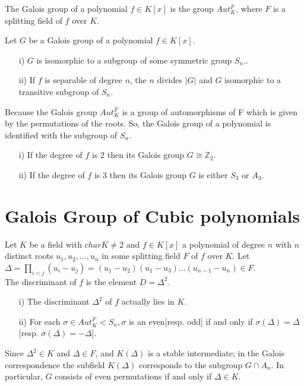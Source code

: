 \begin{definition}
  The Galois group of a polynomial \(f \in K[x]\) is the group \(Aut_K^F\), where \(F\) is a splitting field of \(f\) over \(K\).
  \end{definition}

  \begin{theorem}
  Let \(G\) be a Galois group of a polynomial \(f \in K[x]\).
\begin{enumerate}
\item[i)] \(G\) is isomorphic to a subgroup of some symmetric group \(S_n\)..
  \item[ii)] If \(f\) is separable of degree \(n\), the \(n\) divides \(|G|\) and \(G\) isomorphic to a transitive subgroup of \(S_n\).
  \end{enumerate}
\end{theorem}
Because the Galois group \(Aut_K^F\) is a group of automorphisms of F which is given by the permutations of the roots.
So, the Galois group of a polynomial is identified with the subgroup of \(S_n\).\\

\begin{corollary}
\begin{enumerate}
\item[i)] If the degree of \(f\) is \(2\) then its Galois group \(G \cong {\mathbb{Z}}_2\).
  \item[ii)] If the degree of \(f\) is \(3\) then its Galois group \(G\) is either \(S_3\) or \(A_3\).
  \end{enumerate}
\end{corollary}


\section{Galois Group of Cubic polynomials}
\begin{definition}
  Let \(K\) be a field with \(char K \neq 2\) and \(f \in K[x]\) a polynomial of degree \(n\) with \(n\) distinct roots \(u_1,u_2,...,u_n\) in some splitting field \(F\) of \(f\) over \(K\). Let \(\Delta = \prod\limits_{i<j}(u_i-u_j) = (u_1-u_2)(u_1-u_3)...(u_{n-1}-u_n) \in F\).\\
  The discriminant of \(f\) is the element \(D= {\Delta}^2\).
\end{definition}

\begin{theorem}
\begin{enumerate}
\item[i)] The discriminant \({\Delta}^2\) of \(f\) actually lies in \(K\).
  \item[ii)] For each \(\sigma \in Aut_K^F < S_n, \sigma\) is an even[resp. odd] if and only if \(\sigma(\Delta) = \Delta\)[resp. \(\sigma(\Delta) = - \Delta\)].
  \end{enumerate}
\end{theorem}
Since \({\Delta}^2 \in K\) and \(\Delta \in F\), and \(K(\Delta)\) is a stable intermediate; in the Galois correspondence the subfield \(K(\Delta)\) corresponds to the subgroup \(G \cap A_n\). In particular, \(G\) consists of even permutations if and only if \(\Delta \in K\).

